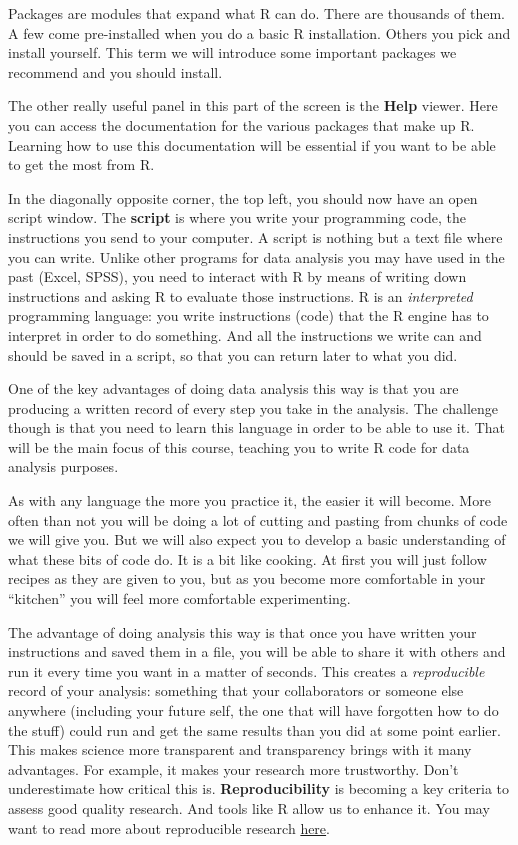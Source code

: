 \documentclass[
]{book}
\begin{document}
Packages are modules that expand what R can do. There are thousands of them. A few come pre-installed when you do a basic R installation. Others you pick and install yourself. This term we will introduce some important packages we recommend and you should install.

The other really useful panel in this part of the screen is the \textbf{Help} viewer. Here you can access the documentation for the various packages that make up R. Learning how to use this documentation will be essential if you want to be able to get the most from R.

In the diagonally opposite corner, the top left, you should now have an open script window. The \textbf{script} is where you write your programming code, the instructions you send to your computer. A script is nothing but a text file where you can write. Unlike other programs for data analysis you may have used in the past (Excel, SPSS), you need to interact with R by means of writing down instructions and asking R to evaluate those instructions. R is an \emph{interpreted} programming language: you write instructions (code) that the R engine has to interpret in order to do something. And all the instructions we write can and should be saved in a script, so that you can return later to what you did.

One of the key advantages of doing data analysis this way is that you are producing a written record of every step you take in the analysis. The challenge though is that you need to learn this language in order to be able to use it. That will be the main focus of this course, teaching you to write R code for data analysis purposes.

As with any language the more you practice it, the easier it will become. More often than not you will be doing a lot of cutting and pasting from chunks of code we will give you. But we will also expect you to develop a basic understanding of what these bits of code do. It is a bit like cooking. At first you will just follow recipes as they are given to you, but as you become more comfortable in your ``kitchen'' you will feel more comfortable experimenting.

The advantage of doing analysis this way is that once you have written your instructions and saved them in a file, you will be able to share it with others and run it every time you want in a matter of seconds. This creates a \emph{reproducible} record of your analysis: something that your collaborators or someone else anywhere (including your future self, the one that will have forgotten how to do the stuff) could run and get the same results than you did at some point earlier. This makes science more transparent and transparency brings with it many advantages. For example, it makes your research more trustworthy. Don't underestimate how critical this is. \textbf{Reproducibility} is becoming a key criteria to assess good quality research. And tools like R allow us to enhance it. You may want to read more about reproducible research \href{http://theconversation.com/the-science-reproducibility-crisis-and-what-can-be-done-about-it-74198}{here}.
\end{document}

